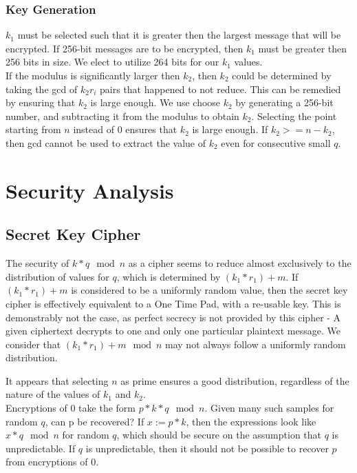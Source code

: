 \documentclass[preprint]{iacrtrans}
\begin{document}
\subsubsection{Key Generation}
$k_1$ must be selected such that it is greater then the largest message that will be encrypted. If 256-bit messages are to be encrypted, then $k_1$ must be greater then 256 bits in size. We elect to utilize 264 bits for our $k_1$ values. \\

If the modulus is significantly larger then $k_2$, then $k_2$ could be determined by taking the gcd of $k_2 r_i$ pairs that happened to not reduce. This can be remedied by ensuring that $k_2$ is large enough. We use choose $k_2$ by generating a 256-bit number, and subtracting it from the modulus to obtain $k_2$. Selecting the point starting from $n$ instead of $0$ ensures that $k_2$ is large enough. If $k_2 >= n - k_2$, then gcd cannot be used to extract the value of $k_2$ even for consecutive small $q$.

\section{Security Analysis}
\subsection{Secret Key Cipher}
The security of $k * q \mod n$ as a cipher seems to reduce almost exclusively to the distribution of values for $q$, which is determined by $(k_1 * r_1) + m$. If $(k_1 * r_1) + m$ is considered to be a uniformly random value, then the secret key cipher is effectively equivalent to a One Time Pad, with a re-usable key. This is demonstrably not the case, as perfect secrecy is not provided by this cipher - A given ciphertext decrypts to one and only one particular plaintext message. We consider that $(k_1 * r_1) + m \mod n$  may not always follow a uniformly random distribution. 

It appears that selecting $n$ as prime ensures a good distribution, regardless of the nature of the values of $k_1$ and $k_2$.\\

Encryptions of 0 take the form $p * k * q \mod n$. Given many such samples for random $q$, can p be recovered? If $x := p * k$, then the expressions look like $x * q \mod n$ for random $q$, which should be secure on the assumption that $q$ is unpredictable. If $q$ is unpredictable, then it should not be possible to recover $p$ from encryptions of $0$.\\
\end{document}
